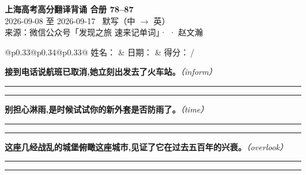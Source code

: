 \documentclass[11pt,a4paper]{article}
\newcommand{\num}[1]{\makebox[1.9em][r]{#1.}\hspace{0.3em}}
\newcommand{\wline}{\noindent\rule{\linewidth}{0.4pt}}
\newcommand{\prompt}[1]{\emph{\textcolor{tipblue}{\small（#1）}}}
\begin{document}
\pagestyle{plain}
\begin{center}
{\LARGE\bfseries 上海高考高分翻译背诵 \quad 合册 78–87}\\[0.25em]
{\large 2026-09-08 至 2026-09-17 \quad\ 默写（中 $\to$ 英）}\\[0.35em]
{\footnotesize 来源：微信公众号「发现之旅 速来记单词」·  · 赵文瀚}
\end{center}

\vspace{0.4em}
\noindent\begin{tabular}{@{}p{0.33\textwidth}@{}p{0.34\textwidth}@{}p{0.33\textwidth}@{}}
姓名：\underline{\hspace{2.0cm}} & 日期：\underline{\hspace{2.0cm}} & 得分：\underline{\hspace{1.4cm}}\,/ \\
\end{tabular}

\vspace{0.5em}

\vspace{0.8em}
\vspace{0.35em}\vspace{0.15em}

\begin{minipage}{\linewidth}

\num{1}\textbf{接到电话说航班已取消,她立刻出发去了火车站。}\prompt{inform}

\vspace{0.3em}

\wline\vspace{0.3em}
\wline

\end{minipage}

\begin{minipage}{\linewidth}

\num{2}\textbf{别担心淋雨,是时候试试你的新外套是否防雨了。}\prompt{time}

\vspace{0.3em}

\wline\vspace{0.3em}
\wline

\end{minipage}

\begin{minipage}{\linewidth}

\num{3}\textbf{这座几经战乱的城堡俯瞰这座城市,见证了它在过去五百年的兴衰。}\prompt{overlook}

\vspace{0.3em}

\wline\vspace{0.3em}
\wline

\end{minipage}
\end{document}
